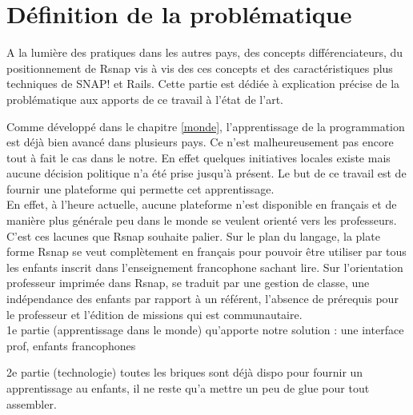 \section{Définition de la problématique}
A la lumière des pratiques dans les autres pays, des concepts différenciateurs, du positionnement de Rsnap vis à vis des ces concepts et des caractéristiques plus techniques de SNAP! et Rails. Cette partie est dédiée à explication précise de la problématique aux apports de ce travail à l'état de l'art.

Comme développé dans le chapitre \ref{monde}, l'apprentissage de la programmation est déjà bien avancé dans plusieurs pays. Ce n'est malheureusement pas encore tout à fait le cas dans le notre. En effet quelques initiatives locales existe mais aucune décision politique n'a été prise jusqu'à présent. Le but de ce travail est de fournir une plateforme qui permette cet apprentissage.\\

En effet, à l'heure actuelle, aucune plateforme n'est disponible en français et de manière plus générale peu dans le monde se veulent orienté vers les professeurs. C'est ces lacunes que Rsnap souhaite palier. Sur le plan du langage, la plate forme Rsnap se veut complètement en français pour pouvoir être utiliser par tous les enfants inscrit dans l'enseignement francophone sachant lire. Sur l'orientation professeur imprimée dans Rsnap, se traduit par une gestion de classe, une indépendance des enfants par rapport à un référent, l'absence de prérequis pour le professeur et l'édition de missions qui est communautaire.\\


1e partie (apprentissage dans le monde) qu'apporte notre solution : une interface prof, enfants francophones

2e partie (technologie) toutes les briques sont déjà dispo pour fournir un apprentissage au enfants, il ne reste qu'a mettre un peu de glue pour tout assembler.
